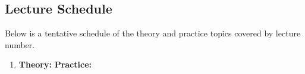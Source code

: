 
\subsection*{Lecture Schedule}

Below is a tentative schedule of the theory and practice topics covered by lecture number. 

\begin{enumerate}[(1)]
\item \textbf{Theory:}
\textbf{Practice:} 

\end{enumerate}

